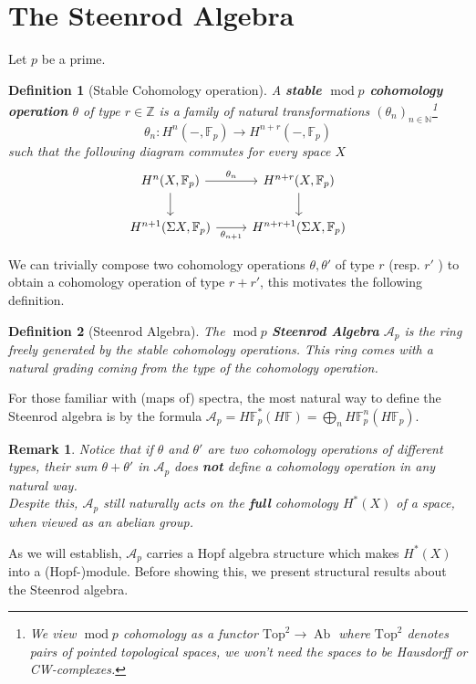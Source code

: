 \documentclass[11pt, a4paper]{article}
\DeclareMathOperator*{\cmod}{mod}
\DeclareMathOperator*{\ab}{Ab}
\newtheorem{defn}{Definition}
\newtheorem{rmk}[thm]{Remark}
\theoremstyle{plain}
\begin{document}
\section{The Steenrod Algebra}
Let $p$ be a prime.
\begin{defn}[Stable Cohomology operation]
	A \textbf{stable $\cmod p$ cohomology operation} $\theta$ of type $r\in \mathbb{Z}$ is a family of natural transformations $( \theta_n)_{n \in \mathbb{N}} $\footnote{We view $\cmod p$ cohomology as a functor $\mathrm{Top}^{2} \to \ab$ where $\mathrm{Top}^{2}$ denotes pairs of pointed topological spaces, we won't need the spaces to be Hausdorff or CW-complexes. }
\[ 
\theta_n\colon H^{n}( -, \mathbb{F}_p) \to H^{n+r}( -, \mathbb{F}_p) 
\]
such that the following diagram commutes for every space $X$ 
\[\begin{tikzcd}
	{H^n(X,\mathbb{F}_p)} & {H^{n+r}(X,\mathbb{F}_p)} \\
	{H^{n+1}(\Sigma X,\mathbb{F}_p)} & {H^{n+r+1}(\Sigma X,\mathbb{F}_p)}
	\arrow["{\theta_n}", from=1-1, to=1-2]
	\arrow[from=1-1, to=2-1]
	\arrow[from=1-2, to=2-2]
	\arrow["{\theta_{n+1}}"', from=2-1, to=2-2]
\end{tikzcd}\]
\end{defn}
We can trivially compose two cohomology operations $\theta, \theta'$ of type $r$ (resp. $r'$ ) to obtain a cohomology operation of type $r+r'$, this motivates the following definition.
\begin{defn}[Steenrod Algebra]
	The $\cmod p$ \textbf{Steenrod Algebra} $\mathcal{A}_p$  is the ring freely generated by the stable cohomology operations.
	This ring comes with a natural grading coming from the type of the cohomology operation.
\end{defn}
For those familiar with (maps of) spectra, the most natural way to define the Steenrod algebra is by the formula $\mathcal{A}_p = H\mathbb{F}_p^{\ast}( H\mathbb{F}) = \bigoplus_n H\mathbb{F}_p^{n}( H\mathbb{F}_p) $.
\begin{rmk}
	Notice that if $\theta$ and $\theta'$ are two cohomology operations of different types, their sum $\theta+\theta'$ in $\mathcal{A}_p$ does \textbf{not} define a cohomology operation in any natural way.\\
	Despite this, $\mathcal{A}_p$ still naturally acts on the \textbf{full} cohomology $H^{\ast}( X) $ of a space, when viewed as an abelian group.
\end{rmk}
As we will establish, $\mathcal{A}_p$ carries a Hopf algebra structure which makes $H^{\ast}( X) $ into a (Hopf-)module.
Before showing this, we present structural results about the Steenrod algebra.
\end{document}
